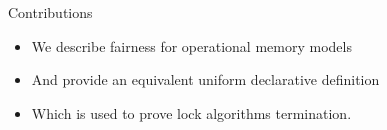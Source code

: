 
\begin{frame}{Contributions}
  \begin{itemize}
  \item We describe fairness for operational memory models
  \item And provide an equivalent uniform declarative definition
  \item Which is used to prove lock algorithms termination.
  \end{itemize}
\end{frame}
